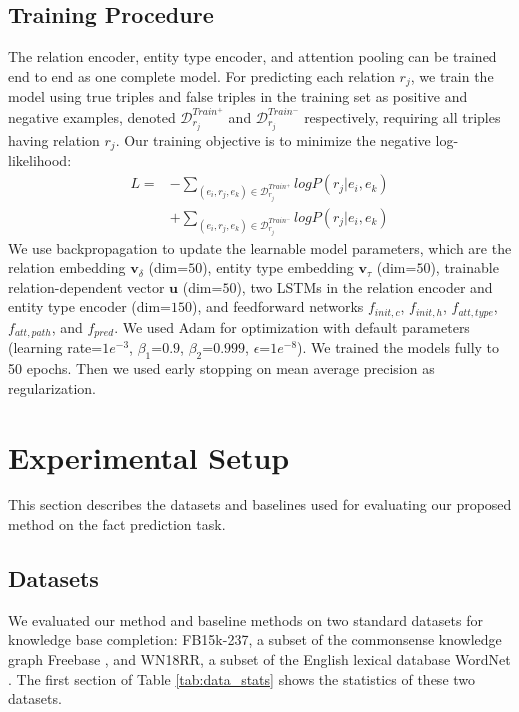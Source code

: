 \documentclass[letterpaper]{article} %
\begin{document}
\subsection{Training Procedure}

The relation encoder, entity type encoder, and attention pooling can be trained end to end as one complete model. For predicting each relation $r_j$, we train the model using true triples and false triples in the training set as positive and negative examples, denoted $\mathcal{D}_{r_j}^{Train^{+}}$ and $\mathcal{D}_{r_j}^{Train^{-}}$ respectively, requiring all triples having relation $r_j$.  Our training objective is to minimize the negative log-likelihood:%
\begin{align}
	L = &- \sum_{(e_i, r_j, e_k) \in \mathcal{D}_{r_j}^{Train^{+}}} logP(r_j|e_i, e_k) \nonumber \\
	&+ \sum_{(e_i, r_j, e_k) \in \mathcal{D}_{r_j}^{Train^{-}}} logP(r_j|e_i, e_k)
\end{align} %
We use backpropagation to update the learnable model parameters, which are the relation embedding $\bm{v}_\delta$ (dim=$50$), entity type embedding $\bm{v}_\tau$ (dim=$50$), trainable relation-dependent vector $\bm{u}$ (dim=$50$), two LSTMs in the relation encoder and entity type encoder (dim=$150$), and feedforward networks $f_{init, c}$, $f_{init, h}$, $f_{att, type}$, $f_{att, path}$, and $f_{pred}$. We used Adam \cite{adam} for optimization with default parameters (learning rate=$1e^{-3}$, $\beta_1$=$0.9$, $\beta_2$=$0.999$, $\epsilon$=$1e^{-8}$). We trained the models fully to 50 epochs. Then we used early stopping on mean average precision as regularization.

\section{Experimental Setup}
This section describes the datasets and baselines used for evaluating our proposed method on the fact prediction task.

\subsection{Datasets}
We evaluated our method and baseline methods on two standard datasets for knowledge base completion: FB15k-237, a subset of the commonsense knowledge graph Freebase \cite{freebase}, and WN18RR, a subset of the English lexical database WordNet \cite{wordnet}. The first section of Table \ref{tab:data_stats} shows the statistics of these two datasets.
\end{document}
